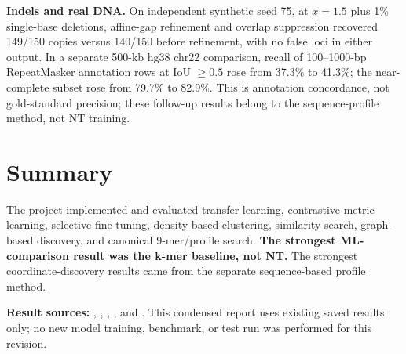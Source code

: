 \documentclass[10pt,a4paper]{article}
\begin{document}
\textbf{Indels and real DNA.} On independent synthetic seed 75, at $x=1.5$ plus 1\% single-base deletions, affine-gap refinement and overlap suppression recovered 149/150 copies versus 140/150 before refinement, with no false loci in either output. In a separate 500-kb hg38 chr22 comparison, recall of 100--1000-bp RepeatMasker annotation rows at IoU $\geq0.5$ rose from 37.3\% to 41.3\%; the near-complete subset rose from 79.7\% to 82.9\%. This is annotation concordance, not gold-standard precision; these follow-up results belong to the sequence-profile method, not NT training.

\section*{Summary}
The project implemented and evaluated transfer learning, contrastive metric learning, selective fine-tuning, density-based clustering, similarity search, graph-based discovery, and canonical 9-mer/profile search. \textbf{The strongest ML-comparison result was the k-mer baseline, not NT.} The strongest coordinate-discovery results came from the separate sequence-based profile method. 

\vfill
{\footnotesize\textbf{Result sources:} , , , , and . This condensed report uses existing saved results only; no new model training, benchmark, or test run was performed for this revision.}
\end{document}
